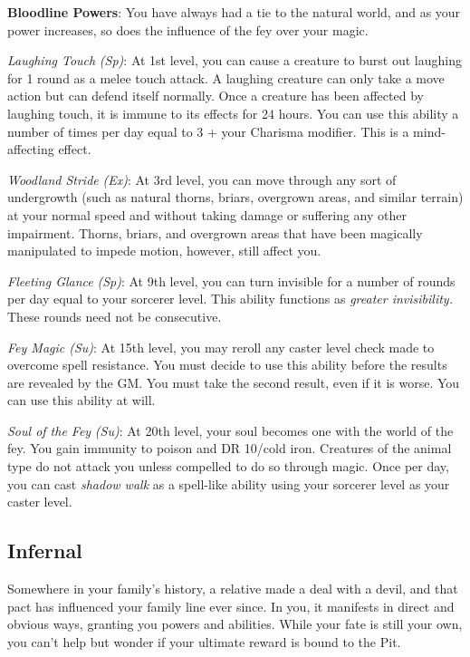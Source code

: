 \textbf{Bloodline Powers}: You have always had a tie to the natural world, and as your power increases, so does the influence of the
fey over your magic.
				
\textit{Laughing Touch} \textit{(Sp)}: At 1st level, you can cause a creature to burst out laughing for 1 round as a melee touch attack.
A laughing creature can only take a move action but can defend itself normally. Once a creature has been affected by laughing touch, 
it is immune to its effects for 24 hours. You can use this ability a number of times per day equal to 3 + your Charisma modifier. This
is a mind-affecting effect.
				
\textit{Woodland Stride} \textit{(Ex)}: At 3rd level, you can move through any sort of undergrowth (such as natural thorns, briars, 
overgrown areas, and similar terrain) at your normal speed and without taking damage or suffering any other impairment. Thorns,
briars, and overgrown areas that have been magically manipulated to impede motion, however, still affect you.
				
\textit{Fleeting Glance} \textit{(Sp)}: At 9th level, you can turn invisible for a number of rounds per day equal to your sorcerer level. This ability functions as \textit{greater invisibility. }These rounds need not be consecutive.
				
\textit{Fey Magic (Su)}: At 15th level, you may reroll any caster level check made to overcome spell resistance. You must decide to 
use this ability before the results are revealed by the GM. You must take the second result, even if it is worse. You can use this 
ability at will.
				
\textit{Soul of the Fey} \textit{(Su)}: At 20th level, your soul becomes one with the world of the fey. You gain immunity to poison 
and DR 10/cold iron. Creatures of the animal type do not attack you unless compelled to do so through magic. Once per day, you can 
cast \textit{shadow walk} as a spell-like ability using your sorcerer level as your caster level.
				
\subsection{Infernal}

				
Somewhere in your family's history, a relative made a deal with a devil, and that pact has influenced your family line ever since.
In you, it manifests in direct and obvious ways, granting you powers and abilities. While your fate is still your own, you can't
help but wonder if your ultimate reward is bound to the Pit.
				
